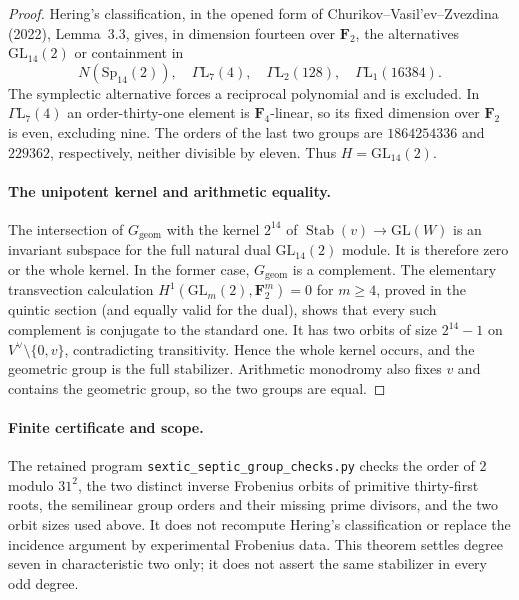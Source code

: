 \begin{proof}
Hering's classification, in the opened form of
Churikov--Vasil'ev--Zvezdina (2022), Lemma~3.3, gives, in dimension
fourteen over $\mathbf F_2$, the alternatives
$\mathrm{GL}_{14}(2)$ or containment in
\[
 N(\mathrm{Sp}_{14}(2)),\quad
 \Gamma\mathrm L_7(4),\quad
 \Gamma\mathrm L_2(128),\quad
 \Gamma\mathrm L_1(16384).
\]
The symplectic alternative forces a reciprocal polynomial and is
excluded.  In $\Gamma\mathrm L_7(4)$ an order-thirty-one element
is $\mathbf F_4$-linear, so its fixed dimension over $\mathbf F_2$
is even, excluding nine.  The orders of the last two groups are
$1864254336$ and $229362$, respectively, neither divisible by eleven.
Thus $H=\mathrm{GL}_{14}(2)$.

\paragraph{The unipotent kernel and arithmetic equality.}
The intersection of $G_{\mathrm{geom}}$ with the kernel
$2^{14}$ of $\operatorname{Stab}(v)\to\mathrm{GL}(W)$ is an invariant
subspace for the full natural dual $\mathrm{GL}_{14}(2)$ module.
It is therefore zero or the whole kernel.  In the former case,
$G_{\mathrm{geom}}$ is a complement.  The elementary transvection
calculation $H^1(\mathrm{GL}_m(2),\mathbf F_2^m)=0$ for $m\ge4$,
proved in the quintic section (and equally valid for the dual),
shows that every such complement is conjugate to the standard one.
It has two orbits of size $2^{14}-1$ on
$V^\vee\setminus\{0,v\}$, contradicting transitivity.
Hence the whole kernel occurs, and the geometric group is the
full stabilizer.  Arithmetic monodromy also fixes $v$ and contains
the geometric group, so the two groups are equal.
\end{proof}

\paragraph{Finite certificate and scope.}
The retained program \texttt{sextic\_septic\_group\_checks.py}
checks the order of $2$ modulo $31^2$, the two distinct inverse
Frobenius orbits of primitive thirty-first roots, the semilinear
group orders and their missing prime divisors, and the two orbit
sizes used above.  It does not recompute Hering's classification
or replace the incidence argument by experimental Frobenius data.
This theorem settles degree seven in characteristic two only;
it does not assert the same stabilizer in every odd degree.
